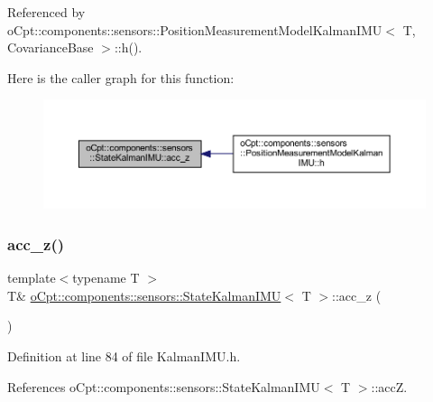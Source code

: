 Referenced by o\+Cpt\+::components\+::sensors\+::\+Position\+Measurement\+Model\+Kalman\+I\+M\+U$<$ T, Covariance\+Base $>$\+::h().

Here is the caller graph for this function\+:
\nopagebreak
\begin{figure}[H]
\begin{center}
\leavevmode
\includegraphics[width=350pt]{classo_cpt_1_1components_1_1sensors_1_1_state_kalman_i_m_u_a0f360ba5c223defb8fbd401b5d46d8df_icgraph}
\end{center}
\end{figure}
\hypertarget{classo_cpt_1_1components_1_1sensors_1_1_state_kalman_i_m_u_a145686ef802ee3cc69d055c5d2b88cc1}{}\label{classo_cpt_1_1components_1_1sensors_1_1_state_kalman_i_m_u_a145686ef802ee3cc69d055c5d2b88cc1} 
\subsubsection{\texorpdfstring{acc\+\_\+z()}{acc\_z()}\hspace{0.1cm}{\footnotesize\ttfamily [2/2]}}
{\footnotesize\ttfamily template$<$typename T $>$ \\
T\& \hyperlink{classo_cpt_1_1components_1_1sensors_1_1_state_kalman_i_m_u}{o\+Cpt\+::components\+::sensors\+::\+State\+Kalman\+I\+MU}$<$ T $>$\+::acc\+\_\+z (\begin{DoxyParamCaption}{ }\end{DoxyParamCaption})\hspace{0.3cm}{\ttfamily [inline]}}



Definition at line 84 of file Kalman\+I\+M\+U.\+h.



References o\+Cpt\+::components\+::sensors\+::\+State\+Kalman\+I\+M\+U$<$ T $>$\+::accZ.

\hypertarget{classo_cpt_1_1components_1_1sensors_1_1_state_kalman_i_m_u_ad906bc0da83225aff73b765af99d5c5b}{}\label{classo_cpt_1_1components_1_1sensors_1_1_state_kalman_i_m_u_ad906bc0da83225aff73b765af99d5c5b} 
